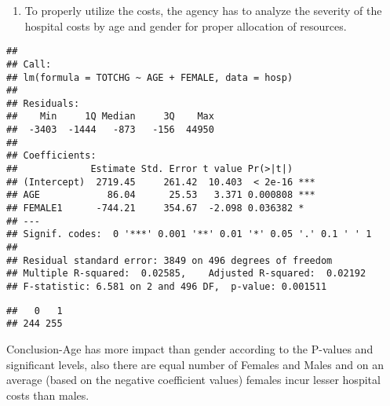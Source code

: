 \documentclass[
]{article}
\newenvironment{Shaded}{\begin{snugshade}}{\end{snugshade}}
\newcommand{\CommentTok}[1]{\textcolor[rgb]{0.56,0.35,0.01}{\textit{#1}}}
\newcommand{\DataTypeTok}[1]{\textcolor[rgb]{0.13,0.29,0.53}{#1}}
\newcommand{\KeywordTok}[1]{\textcolor[rgb]{0.13,0.29,0.53}{\textbf{#1}}}
\newcommand{\NormalTok}[1]{#1}
\newcommand{\OperatorTok}[1]{\textcolor[rgb]{0.81,0.36,0.00}{\textbf{#1}}}
\providecommand{\tightlist}{%
  \setlength{\itemsep}{0pt}\setlength{\parskip}{0pt}}
\begin{document}
\begin{enumerate}
\def\labelenumi{\Roman{enumi}.}
\setcounter{enumi}{3}
\tightlist
\item
  To properly utilize the costs, the agency has to analyze the severity
  of the hospital costs by age and gender for proper allocation of
  resources.
\end{enumerate}

\begin{Shaded}
\end{Shaded}

\begin{verbatim}
## 
## Call:
## lm(formula = TOTCHG ~ AGE + FEMALE, data = hosp)
## 
## Residuals:
##    Min     1Q Median     3Q    Max 
##  -3403  -1444   -873   -156  44950 
## 
## Coefficients:
##             Estimate Std. Error t value Pr(>|t|)    
## (Intercept)  2719.45     261.42  10.403  < 2e-16 ***
## AGE            86.04      25.53   3.371 0.000808 ***
## FEMALE1      -744.21     354.67  -2.098 0.036382 *  
## ---
## Signif. codes:  0 '***' 0.001 '**' 0.01 '*' 0.05 '.' 0.1 ' ' 1
## 
## Residual standard error: 3849 on 496 degrees of freedom
## Multiple R-squared:  0.02585,    Adjusted R-squared:  0.02192 
## F-statistic: 6.581 on 2 and 496 DF,  p-value: 0.001511
\end{verbatim}

\begin{Shaded}
\end{Shaded}

\begin{verbatim}
##   0   1 
## 244 255
\end{verbatim}

Conclusion-Age has more impact than gender according to the P-values and
significant levels, also there are equal number of Females and Males and
on an average (based on the negative coefficient values) females incur
lesser hospital costs than males.
\end{document}
